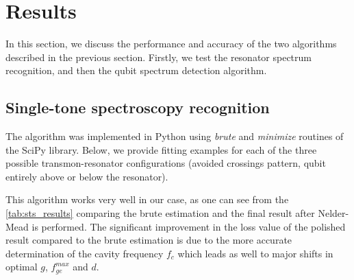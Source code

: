 \documentclass[%
 aip,
 amsmath,amssymb,
 reprint,%
]{revtex4-1}
\begin{document}
\section{Results}

In this section, we discuss the performance and accuracy of the two algorithms described in the previous section. Firstly, we test the resonator spectrum recognition, and then the qubit spectrum detection algorithm.

\subsection{Single-tone spectroscopy recognition}

The algorithm was implemented in Python using \textit{brute} and \textit{minimize} routines of the SciPy\cite{scipy} library. Below, we provide fitting examples for each of the three possible transmon-resonator configurations (avoided crossings pattern, qubit entirely above or below the resonator).

This algorithm works very well in our case, as one can see from the \autoref{tab:sts_results} comparing the brute estimation and  the final result after Nelder-Mead is performed. The significant improvement in the loss value of the polished result compared to the brute estimation is due to the more accurate determination of the cavity frequency $f_c$ which leads as well to major shifts in optimal $g$, $f_{ge}^{max}$ and $d$.
\end{document}
